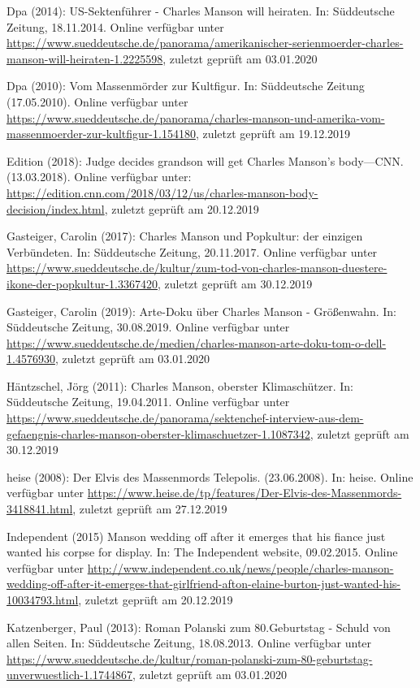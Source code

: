 \documentclass[
]{article}
\begin{document}
Dpa (2014): US-Sektenführer - Charles Manson will heiraten. In:
Süddeutsche Zeitung, 18.11.2014. Online verfügbar unter
\url{https://www.sueddeutsche.de/panorama/amerikanischer-serienmoerder-charles-manson-will-heiraten-1.2225598},
zuletzt geprüft am 03.01.2020

Dpa (2010): Vom Massenmörder zur Kultfigur. In: Süddeutsche Zeitung
(17.05.2010). Online verfügbar unter
\url{https://www.sueddeutsche.de/panorama/charles-manson-und-amerika-vom-massenmoerder-zur-kultfigur-1.154180},
zuletzt geprüft am 19.12.2019

Edition (2018): Judge decides grandson will get Charles Manson's
body---CNN. (13.03.2018). Online verfügbar unter:
\url{https://edition.cnn.com/2018/03/12/us/charles-manson-body-decision/index.html},
zuletzt geprüft am 20.12.2019

Gasteiger, Carolin (2017): Charles Manson und Popkultur: der einzigen
Verbündeten. In: Süddeutsche Zeitung, 20.11.2017. Online verfügbar unter
\url{https://www.sueddeutsche.de/kultur/zum-tod-von-charles-manson-duestere-ikone-der-popkultur-1.3367420},
zuletzt geprüft am 30.12.2019

Gasteiger, Carolin (2019): Arte-Doku über Charles Manson - Größenwahn.
In: Süddeutsche Zeitung, 30.08.2019. Online verfügbar unter
\url{https://www.sueddeutsche.de/medien/charles-manson-arte-doku-tom-o-dell-1.4576930},
zuletzt geprüft am 03.01.2020

Häntzschel, Jörg (2011): Charles Manson, oberster Klimaschützer. In:
Süddeutsche Zeitung, 19.04.2011. Online verfügbar unter
\url{https://www.sueddeutsche.de/panorama/sektenchef-interview-aus-dem-gefaengnis-charles-manson-oberster-klimaschuetzer-1.1087342},
zuletzt geprüft am 30.12.2019

heise (2008): Der Elvis des Massenmords \textbar{} Telepolis.
(23.06.2008). In: heise. Online verfügbar unter
\url{https://www.heise.de/tp/features/Der-Elvis-des-Massenmords-3418841.html},
zuletzt geprüft am 27.12.2019

Independent (2015) Manson wedding off after it emerges that his fiance
just wanted his corpse for display. In: The Independent website,
09.02.2015. Online verfügbar unter
\url{http://www.independent.co.uk/news/people/charles-manson-wedding-off-after-it-emerges-that-girlfriend-afton-elaine-burton-just-wanted-his-10034793.html},
zuletzt geprüft am 20.12.2019

Katzenberger, Paul (2013): Roman Polanski zum 80.Geburtstag - Schuld von
allen Seiten. In: Süddeutsche Zeitung, 18.08.2013. Online verfügbar
unter
\url{https://www.sueddeutsche.de/kultur/roman-polanski-zum-80-geburtstag-unverwuestlich-1.1744867},
zuletzt geprüft am 03.01.2020
\end{document}
